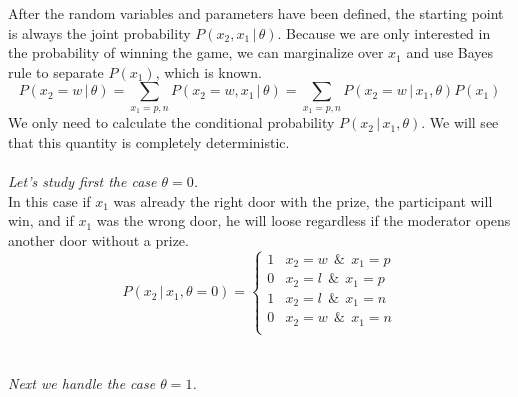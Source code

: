 \documentclass{tstextbook}
\begin{document}
\begin{example}
After the random variables and parameters have been defined, the starting point is always the joint probability $P(x_2,x_1\,\vert\,\theta)$. Because we are only interested in the probability of winning the game, we can marginalize over $x_1$ and use Bayes rule to separate $P(x_1)$, which is known.
  \begin{equation}
    P(x_2=w\,\vert\,\theta)=\sum_{x_1=p,n}P(x_2=w,x_1\,\vert\,\theta)=
    \sum_{x_1=p,n}P(x_2=w\,\vert\,x_1,\theta)P(x_1)
  \end{equation}    
We only need to calculate the conditional probability $P(x_2\,\vert\,x_1,\theta)$. We will see that this quantity is completely deterministic. 
\\
\\
\textit{Let's study first the case $\theta=0$.}\\

In this case if $x_1$ was already the right door with the prize, the participant will win, and if $x_1$ was the wrong door, he will loose regardless if the moderator opens another door without a prize.
  \begin{equation}
   P(x_2\,\vert\,x_1,\theta=0)=
\begin{cases}
1 & x_2=w\:\ \&\:\ x_1=p \\
0 & x_2=l\:\ \&\:\ x_1=p \\
1 & x_2=l\:\ \&\:\ x_1=n \\
0 & x_2=w\:\ \&\:\ x_1=n \\
\end{cases}
  \end{equation}
\\
\\  
\textit{Next we handle the case $\theta=1$.}\\


\end{example}
\end{document}
